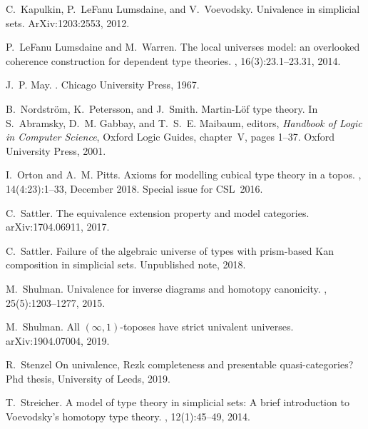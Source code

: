 \documentclass[reqno,10pt,a4paper,oneside,draft]{amsart}
\numberwithin{equation}{section}
\theoremstyle{mythm}
\theoremstyle{mydef}
\theoremstyle{myrmk}
\begin{document}
\begin{thebibliography}{{}dBM15}
C.~Kapulkin, P.~LeFanu Lumsdaine, and V.~Voevodsky.
\newblock Univalence in simplicial sets.
\newblock ArXiv:1203:2553, 2012.

P.~LeFanu Lumsdaine and M.~Warren.
\newblock The local universes model: an overlooked coherence construction for
  dependent type theories.
, 16(3):23.1--23.31, 2014.

J.~P. May.
.
\newblock Chicago University Press, 1967.

B.~Nordstr\"om, K.~Petersson, and J.~Smith.
\newblock Martin-{L}\"of type theory.
\newblock In S.~Abramsky, D.~M. Gabbay, and T.~S.~E. Maibaum, editors, {\em
  Handbook of Logic in Computer Science}, Oxford Logic Guides, chapter~V, pages
  1--37. Oxford University Press, 2001.

I.~Orton and A.~M. Pitts.
\newblock Axioms for modelling cubical type theory in a topos.
, 14(4:23):1--33, December
  2018.
\newblock Special issue for CSL~2016.

C.~Sattler.
\newblock The equivalence extension property and model categories.
\newblock arXiv:1704.06911, 2017.

C.~Sattler.
\newblock Failure of the algebraic universe of types with prism-based {K}an
  composition in simplicial sets.
\newblock Unpublished note, 2018.

M.~Shulman.
\newblock Univalence for inverse diagrams and homotopy canonicity.
, 25(5):1203--1277, 2015.

M.~Shulman.
\newblock All $(\infty,1)$-toposes have strict univalent universes.
\newblock arXiv:1904.07004, 2019.

    R.~Stenzel
    \newblock On univalence, Rezk completeness and presentable quasi-categories?
    \newblock Phd thesis, University of Leeds, 2019.
    

T.~Streicher.
\newblock A model of type theory in simplicial sets: {A} brief introduction to
  {V}oevodsky's homotopy type theory.
, 12(1):45--49, 2014.


\end{thebibliography}
\end{document}

